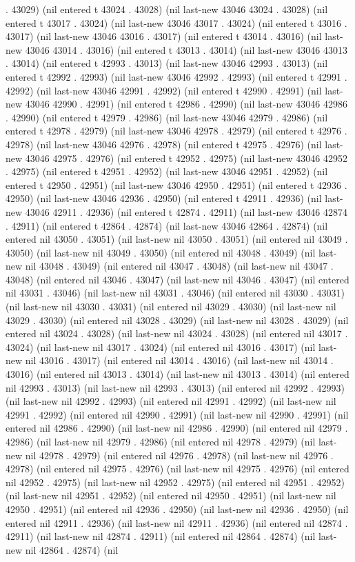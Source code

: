 . 43029) (nil entered t 43024 . 43028) (nil last-new 43046 43024 . 43028) (nil entered t 43017 . 43024) (nil last-new 43046 43017 . 43024) (nil entered t 43016 . 43017) (nil last-new 43046 43016 . 43017) (nil entered t 43014 . 43016) (nil last-new 43046 43014 . 43016) (nil entered t 43013 . 43014) (nil last-new 43046 43013 . 43014) (nil entered t 42993 . 43013) (nil last-new 43046 42993 . 43013) (nil entered t 42992 . 42993) (nil last-new 43046 42992 . 42993) (nil entered t 42991 . 42992) (nil last-new 43046 42991 . 42992) (nil entered t 42990 . 42991) (nil last-new 43046 42990 . 42991) (nil entered t 42986 . 42990) (nil last-new 43046 42986 . 42990) (nil entered t 42979 . 42986) (nil last-new 43046 42979 . 42986) (nil entered t 42978 . 42979) (nil last-new 43046 42978 . 42979) (nil entered t 42976 . 42978) (nil last-new 43046 42976 . 42978) (nil entered t 42975 . 42976) (nil last-new 43046 42975 . 42976) (nil entered t 42952 . 42975) (nil last-new 43046 42952 . 42975) (nil entered t 42951 . 42952) (nil last-new 43046 42951 . 42952) (nil entered t 42950 . 42951) (nil last-new 43046 42950 . 42951) (nil entered t 42936 . 42950) (nil last-new 43046 42936 . 42950) (nil entered t 42911 . 42936) (nil last-new 43046 42911 . 42936) (nil entered t 42874 . 42911) (nil last-new 43046 42874 . 42911) (nil entered t 42864 . 42874) (nil last-new 43046 42864 . 42874) (nil entered nil 43050 . 43051) (nil last-new nil 43050 . 43051) (nil entered nil 43049 . 43050) (nil last-new nil 43049 . 43050) (nil entered nil 43048 . 43049) (nil last-new nil 43048 . 43049) (nil entered nil 43047 . 43048) (nil last-new nil 43047 . 43048) (nil entered nil 43046 . 43047) (nil last-new nil 43046 . 43047) (nil entered nil 43031 . 43046) (nil last-new nil 43031 . 43046) (nil entered nil 43030 . 43031) (nil last-new nil 43030 . 43031) (nil entered nil 43029 . 43030) (nil last-new nil 43029 . 43030) (nil entered nil 43028 . 43029) (nil last-new nil 43028 . 43029) (nil entered nil 43024 . 43028) (nil last-new nil 43024 . 43028) (nil entered nil 43017 . 43024) (nil last-new nil 43017 . 43024) (nil entered nil 43016 . 43017) (nil last-new nil 43016 . 43017) (nil entered nil 43014 . 43016) (nil last-new nil 43014 . 43016) (nil entered nil 43013 . 43014) (nil last-new nil 43013 . 43014) (nil entered nil 42993 . 43013) (nil last-new nil 42993 . 43013) (nil entered nil 42992 . 42993) (nil last-new nil 42992 . 42993) (nil entered nil 42991 . 42992) (nil last-new nil 42991 . 42992) (nil entered nil 42990 . 42991) (nil last-new nil 42990 . 42991) (nil entered nil 42986 . 42990) (nil last-new nil 42986 . 42990) (nil entered nil 42979 . 42986) (nil last-new nil 42979 . 42986) (nil entered nil 42978 . 42979) (nil last-new nil 42978 . 42979) (nil entered nil 42976 . 42978) (nil last-new nil 42976 . 42978) (nil entered nil 42975 . 42976) (nil last-new nil 42975 . 42976) (nil entered nil 42952 . 42975) (nil last-new nil 42952 . 42975) (nil entered nil 42951 . 42952) (nil last-new nil 42951 . 42952) (nil entered nil 42950 . 42951) (nil last-new nil 42950 . 42951) (nil entered nil 42936 . 42950) (nil last-new nil 42936 . 42950) (nil entered nil 42911 . 42936) (nil last-new nil 42911 . 42936) (nil entered nil 42874 . 42911) (nil last-new nil 42874 . 42911) (nil entered nil 42864 . 42874) (nil last-new nil 42864 . 42874) (nil 